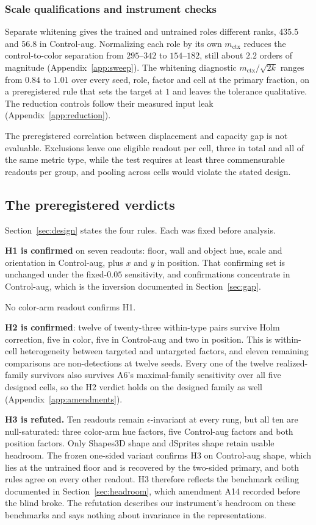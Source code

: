 \documentclass[10pt]{article}
\begin{document}
\subsubsection*{Scale qualifications and instrument checks}
Separate whitening gives the trained and untrained roles different ranks, $435.5$ and $56.8$ in
Control-aug. Normalizing each role by its own $m_{\mathrm{ctx}}$ reduces the control-to-color separation from $295$--$342$ to $154$--$182$, still about $2.2$ orders of magnitude
(Appendix~\ref{app:sweep}). The whitening diagnostic $m_{\mathrm{ctx}}/\sqrt{2k}$ ranges from $0.84$ to $1.01$ over every seed, role, factor and cell at the primary fraction, on a
preregistered rule that sets the target at $1$ and leaves the tolerance qualitative. The reduction
controls follow their measured input leak (Appendix~\ref{app:reduction}).

The preregistered correlation between displacement and capacity gap is not evaluable. Exclusions
leave one eligible readout per cell, three in total and all of the same metric type, while the test
requires at least three commensurable readouts per group, and pooling across cells would violate the
stated design.

\subsection{The preregistered verdicts}
\label{sec:prereg}
Section~\ref{sec:design} states the four rules. Each was fixed before analysis.

\textbf{H1 is confirmed} on seven readouts: floor, wall and object hue, scale and orientation in
Control-aug, plus $x$ and $y$ in position. That confirming set is unchanged under the fixed-$0.05$
sensitivity, and confirmations concentrate in Control-aug, which is the inversion documented in
Section~\ref{sec:gap}.

No color-arm readout confirms H1.

\textbf{H2 is confirmed}: twelve of twenty-three within-type pairs survive Holm correction, five
in color, five in Control-aug and two in position. This is within-cell heterogeneity between
targeted and untargeted factors, and eleven remaining comparisons are non-detections at twelve
seeds. Every one of the twelve realized-family survivors also survives A6's maximal-family
sensitivity over all five designed cells, so the H2 verdict holds on the designed family as well
(Appendix~\ref{app:amendments}).

\textbf{H3 is refuted.} Ten readouts remain $\epsilon$-invariant at every rung, but all ten are
null-saturated: three color-arm hue factors, five Control-aug factors and both position factors.
Only Shapes3D shape and dSprites shape retain usable headroom. The frozen one-sided variant confirms
H3 on Control-aug shape, which lies at the untrained floor and is recovered by the two-sided
primary, and both rules agree on every other readout. H3 therefore reflects the benchmark ceiling
documented in Section~\ref{sec:headroom}, which amendment A14 recorded before the blind broke. The
refutation describes our instrument's headroom on these benchmarks and says nothing about
invariance in the representations.
\end{document}
